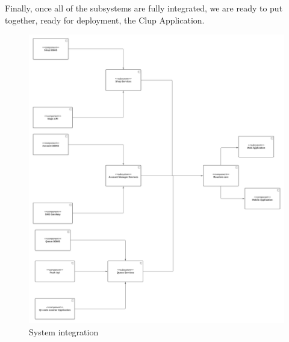 Finally, once all of the subsystems are fully integrated, we are ready to put together, ready for deployment, the Clup Application.

\begin{figure}[h!]
    \centering
    \includegraphics[width=1\textwidth]{Images/TestDiagram/whole application.png}
    \caption{\label{fig:wholeapp}{System integration}}
\end{figure}
\FloatBarrier 






